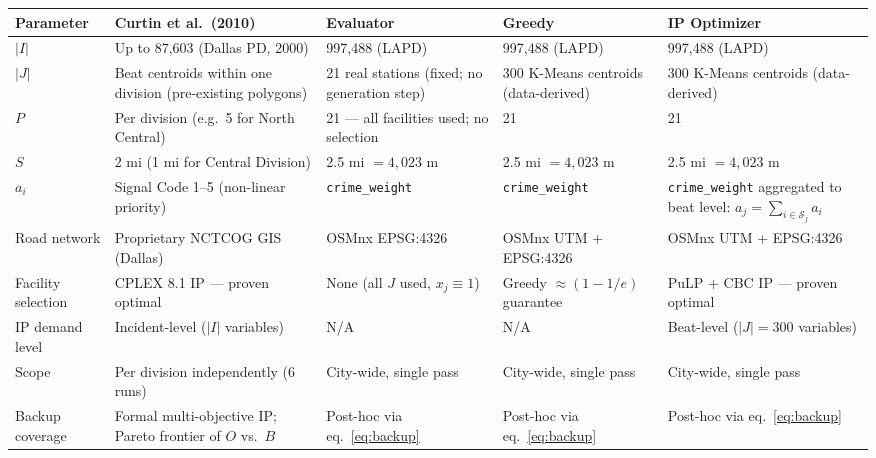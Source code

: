 \documentclass[12pt]{article}
\begin{document}
\renewcommand{\arraystretch}{1.45}
\begin{tabularx}{\textwidth}{@{} l X X X X @{}}
\toprule
\textbf{Parameter}
  & \textbf{Curtin et al.\ (2010)}
  & \textbf{Evaluator}
  & \textbf{Greedy}
  & \textbf{IP Optimizer} \\
\midrule

$|I|$
  & Up to 87,603 (Dallas PD, 2000)
  & 997,488 (LAPD)
  & 997,488 (LAPD)
  & 997,488 (LAPD) \\

$|J|$
  & Beat centroids within one division (pre-existing polygons)
  & 21 real stations (fixed; no generation step)
  & 300 K-Means centroids (data-derived)
  & 300 K-Means centroids (data-derived) \\

$P$
  & Per division (e.g.\ 5 for North Central)
  & 21 — all facilities used; no selection
  & 21
  & 21 \\

$S$
  & 2 mi (1 mi for Central Division)
  & 2.5 mi $= 4{,}023$ m
  & 2.5 mi $= 4{,}023$ m
  & 2.5 mi $= 4{,}023$ m \\

$a_i$
  & Signal Code 1–5 (non-linear priority)
  & \texttt{crime\_weight}
  & \texttt{crime\_weight}
  & \texttt{crime\_weight} aggregated to beat level: $a_j = \sum_{i \in \mathcal{S}_j} a_i$ \\

Road network
  & Proprietary NCTCOG GIS (Dallas)
  & OSMnx EPSG:4326
  & OSMnx UTM + EPSG:4326
  & OSMnx UTM + EPSG:4326 \\

Facility selection
  & CPLEX 8.1 IP — proven optimal
  & None (all $J$ used, $x_j \equiv 1$)
  & Greedy $\approx (1-1/e)$ guarantee
  & PuLP + CBC IP — proven optimal \\

IP demand level
  & Incident-level ($|I|$ variables)
  & N/A
  & N/A
  & Beat-level ($|J|=300$ variables) \\

Scope
  & Per division independently (6 runs)
  & City-wide, single pass
  & City-wide, single pass
  & City-wide, single pass \\

Backup coverage
  & Formal multi-objective IP; Pareto frontier of $O$ vs.\ $B$
  & Post-hoc via eq.\ \eqref{eq:backup}
  & Post-hoc via eq.\ \eqref{eq:backup}
  & Post-hoc via eq.\ \eqref{eq:backup} \\

\bottomrule
\end{tabularx}
\end{document}
